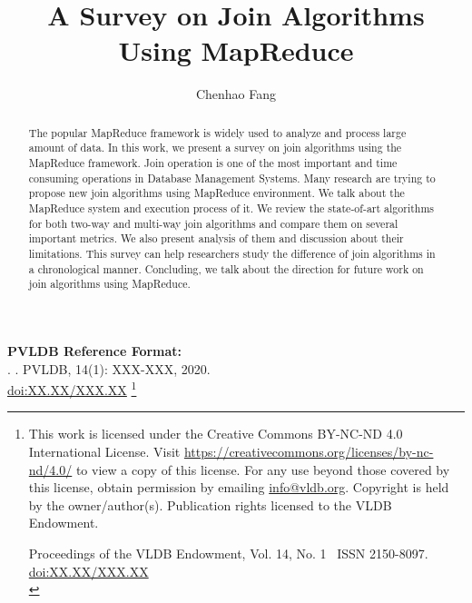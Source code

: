 \documentclass[sigconf, nonacm]{acmart}
\newcommand\vldbdoi{XX.XX/XXX.XX}
\newcommand\vldbpages{XXX-XXX}
\newcommand\vldbvolume{14}
\newcommand\vldbissue{1}
\newcommand\vldbyear{2020}
\newcommand\vldbauthors{\authors}
\newcommand\vldbtitle{\shorttitle}
\newcommand\vldbpagestyle{plain}
\begin{document}
\title{A Survey on Join Algorithms Using MapReduce}

\author{Chenhao Fang}



\begin{abstract}
The popular MapReduce framework is widely used to analyze and process large amount of data. In this work, we present a survey on join algorithms using the MapReduce framework. Join operation is one of the most important and time consuming operations in Database Management Systems. Many research are trying to propose new join algorithms using MapReduce environment. We talk about the MapReduce system and execution process of it. We review the state-of-art algorithms for both two-way and multi-way join algorithms and compare them on several important metrics. We also present analysis of them and discussion about their limitations. This survey can help researchers study the difference of join algorithms in a chronological manner. Concluding, we talk about the direction for future work on join algorithms using MapReduce.
\end{abstract}

\maketitle

\pagestyle{\vldbpagestyle}
\begingroup\small\noindent\raggedright\textbf{PVLDB Reference Format:}\\
\vldbauthors. \vldbtitle. PVLDB, \vldbvolume(\vldbissue): \vldbpages, \vldbyear.\\
\href{https://doi.org/\vldbdoi}{doi:\vldbdoi}
\endgroup
\begingroup
\renewcommand\thefootnote{}\footnote{\noindent
This work is licensed under the Creative Commons BY-NC-ND 4.0 International License. Visit \url{https://creativecommons.org/licenses/by-nc-nd/4.0/} to view a copy of this license. For any use beyond those covered by this license, obtain permission by emailing \href{mailto:info@vldb.org}{info@vldb.org}. Copyright is held by the owner/author(s). Publication rights licensed to the VLDB Endowment. \\
\raggedright Proceedings of the VLDB Endowment, Vol. \vldbvolume, No. \vldbissue\ %
ISSN 2150-8097. \\
\href{https://doi.org/\vldbdoi}{doi:\vldbdoi} \\
}\addtocounter{footnote}{-1}\endgroup
\end{document}

